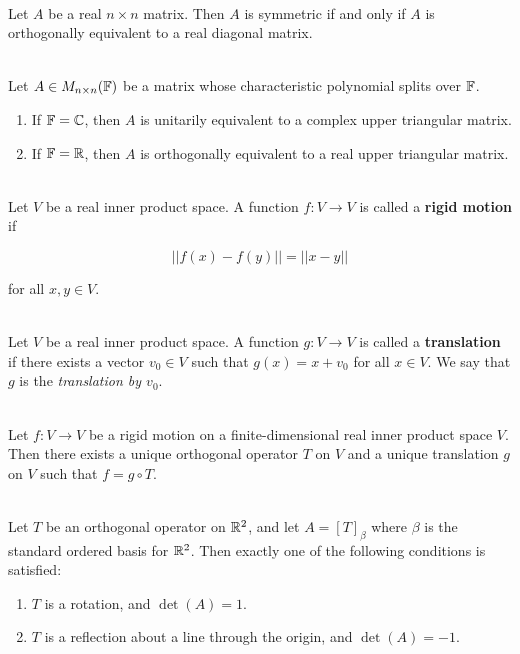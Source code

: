 \begin{theorem}
	\hfill\\
	Let $A$ be a real $n \times n$ matrix. Then $A$ is symmetric if and only if $A$ is orthogonally equivalent to a real diagonal matrix.
\end{theorem}

\begin{theorem}
	\hfill\\
	Let $A \in M_{n \times n}(\mathbb{F})$ be a matrix whose characteristic polynomial splits over $\mathbb{F}$.

	\begin{enumerate}
		\item If $\mathbb{F} = \mathbb{C}$, then $A$ is unitarily equivalent to a complex upper triangular matrix.
		\item If $\mathbb{F} = \mathbb{R}$, then $A$ is orthogonally equivalent to a real upper triangular matrix.
	\end{enumerate}
\end{theorem}

\begin{definition}
	\hfill\\
	Let $V$ be a real inner product space. A function $f: V \to V$ is called a \textbf{rigid motion} if

	\[||f(x) - f(y)|| = ||x - y||\]

	for all $x,y \in V$.
\end{definition}

\begin{definition}
	\hfill\\
	Let $V$ be a real inner product space. A function $g: V \to V$ is called a \textbf{translation} if there exists a vector $v_0 \in V$ such that $g(x) = x + v_0$ for all $x \in V$. We say that $g$ is the \textit{translation by $v_0$}.
\end{definition}

\begin{theorem}
	\hfill\\
	Let $f: V \to V$ be a rigid motion on a finite-dimensional real inner product space $V$. Then there exists a unique orthogonal operator $T$ on $V$ and a unique translation $g$ on $V$ such that $f = g \circ T$.
\end{theorem}

\begin{theorem}
	\hfill\\
	Let $T$ be an orthogonal operator on $\mathbb{R}^2$, and let $A = [T]_\beta$ where $\beta$ is the standard ordered basis for $\mathbb{R}^2$. Then exactly one of the following conditions is satisfied:

	\begin{enumerate}
		\item $T$ is a rotation, and $\det(A) = 1$.
		\item $T$ is a reflection about a line through the origin, and $\det(A) = -1$.
	\end{enumerate}
\end{theorem}

